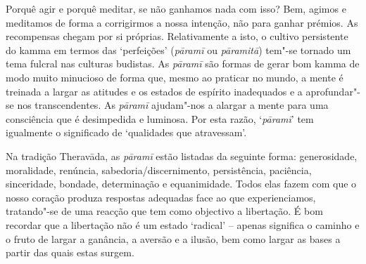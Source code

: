 Porquê agir e porquê meditar, se não ganhamos nada com isso? Bem, agimos e
meditamos de forma a corrigirmos a nossa intenção, não para ganhar prémios. As
recompensas chegam por si próprias. Relativamente a isto, o cultivo persistente
do kamma em termos das `perfeições' (\emph{pāramī} ou \emph{pāramitā}) tem"-se
tornado um tema fulcral nas culturas budistas.
As \emph{pāramī} são formas de gerar bom kamma de modo muito minucioso de forma
que, mesmo ao praticar no mundo, a mente é treinada a largar as atitudes e os
estados de espírito inadequados e a aprofundar"-se nos transcendentes. As
\emph{pāramī} ajudam"-nos a alargar a mente para uma consciência que é
desimpedida e luminosa. Por esta razão, `\emph{pāramī}' tem igualmente o
significado de `qualidades que atravessam'.

Na tradição Theravāda, as \emph{pāramī} estão listadas da seguinte forma:
generosidade, moralidade, renúncia, sabedoria/discernimento, persistência,
paciência, sinceridade, bondade, determinação e equanimidade. Todos elas fazem
com que o nosso coração produza respostas adequadas face ao que experienciamos,
tratando"-se de uma reacção que tem como objectivo a libertação. É bom recordar
que a libertação não é um estado `radical' -- apenas significa o caminho e o
fruto de largar a ganância, a aversão e a ilusão, bem como largar as bases a
partir das quais estas surgem.

